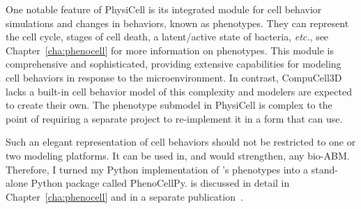 One notable feature of PhysiCell is its integrated module for cell behavior simulations and changes in behaviors, known as phenotypes. They can represent the cell cycle, stages of cell death, a latent/active state of bacteria, \textit{etc.}, see Chapter~\ref{cha:phenocell} for more information on phenotypes. This module is comprehensive and sophisticated, providing extensive capabilities for modeling cell behaviors in response to the microenvironment. In contrast, CompuCell3D lacks a built-in cell behavior model of this complexity and modelers are expected to create their own. The phenotype submodel in PhysiCell is complex to the point of requiring a separate project to re-implement it in a form that \ccds can use. 

Such an elegant representation of cell behaviors should not be restricted to one or two modeling platforms. It can be used in, and would strengthen, any bio-ABM. Therefore, I turned my Python implementation of \psc's phenotypes into a stand-alone Python package called PhenoCellPy. \pcps is discussed in detail in Chapter~\ref{cha:phenocell} and in a separate publication~\cite{gianlupi_phenocellpy_2023}.







